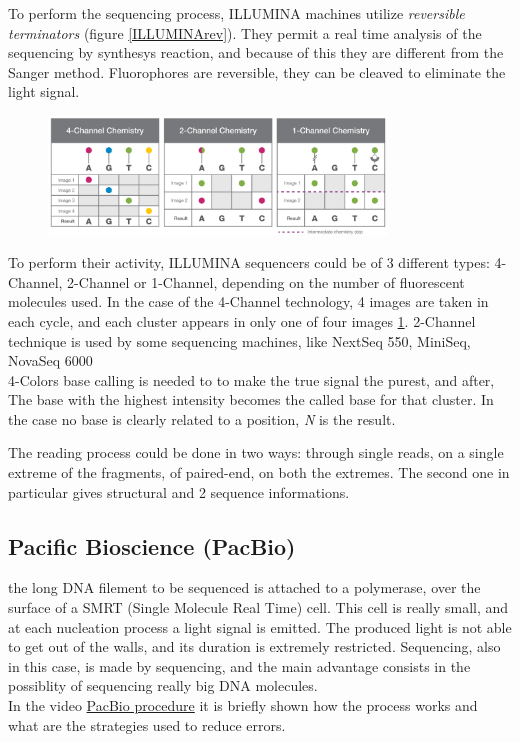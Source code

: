 To perform the sequencing process, ILLUMINA machines utilize \textit{reversible terminators} (figure \ref{ILLUMINArev}). They permit a real time analysis of the sequencing by synthesys reaction, and because of this they are different from the Sanger method. Fluorophores are reversible, they can be cleaved to eliminate the light signal.

\begin{figure}[h]
\caption{}
\centering
\includegraphics[width=0.8\textwidth]{ChannelILLUMINA}
\label{ChannelILLUMINA}
\end{figure}

To perform their activity, ILLUMINA sequencers could be of 3 different types: 4-Channel, 2-Channel or 1-Channel, depending on the number of fluorescent molecules used. In the case of the 4-Channel technology, 4 images are taken in each cycle, and each  cluster appears in only one of four images \ref{ChannelILLUMINA}. 2-Channel technique is used by some sequencing machines, like NextSeq 550, MiniSeq, NovaSeq 6000\\

4-Colors base calling 
is needed to to make
the true signal the purest, and after, The base with the highest intensity becomes the called base for that cluster. In the case no base is clearly related to a position, \textit{N} is the result.


The reading process could be done in two ways: through single reads, on a single extreme of the fragments, of paired-end, on both the extremes. The second one in particular gives structural and 2 sequence  informations. 


\subsection{Pacific Bioscience (PacBio)}	
the long DNA filement to be sequenced is attached to a polymerase, over the surface of a SMRT (Single Molecule Real Time) cell. This cell is really small, and at each nucleation process a light signal is emitted. The produced light is not able to get out of the walls, and its duration is extremely restricted. Sequencing, also in this case, is made by sequencing, and the main advantage consists in the possiblity of sequencing really big DNA molecules.\\
In the video \href{https://www.youtube.com/watch?v=_lD8JyAbwEo}{PacBio procedure} it is briefly shown how the process works and what are the strategies used to reduce errors. 

